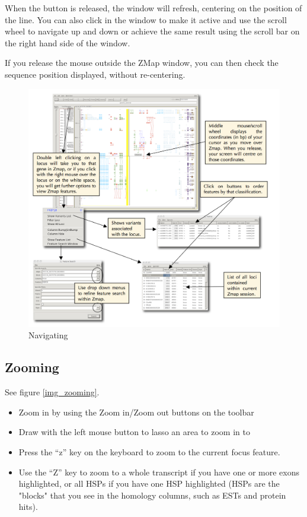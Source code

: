 \documentclass[letterpaper]{article}
\begin{document}
When the button is released, the window will refresh, centering on the position of the line. You can also click in the window to make it active and use the scroll wheel to navigate up and down or achieve the same result using the scroll bar on the right hand side of the window.

If you release the mouse outside the ZMap window, you can then check the sequence position displayed, without re-centering.

\begin{figure}
\centering
\color[rgb]{0.30980393,0.5058824,0.7411765}
\includegraphics[width=15.231cm]{img_navigating.png}
\caption{Navigating}
\label{img_navigating}
\end{figure}

\subsection{Zooming}
See figure \ref{img_zooming}.

\begin{itemize}
\item Zoom in by using the Zoom in/Zoom out buttons on the toolbar
\item Draw with the left mouse button to lasso an area to zoom in to
\item Press the ``z'' key on the keyboard to zoom to the current focus feature.
\item Use the ``Z'' key to zoom to a whole transcript if you have one or more exons highlighted, or all HSPs if you have one HSP highlighted (HSPs are the "blocks" that you see in the homology columns, such as ESTs and protein hits). 
\end{itemize}
\end{document}
